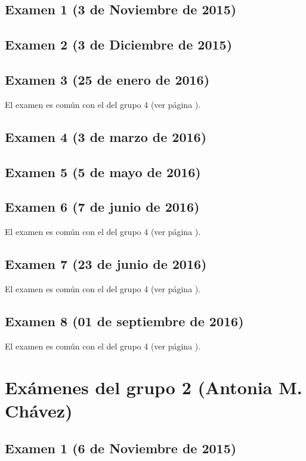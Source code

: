 \documentclass[a4paper,12pt,twoside]{book}
\begin{document}
\subsection{Examen 1 (3 de Noviembre de 2015)}
\subsection{Examen 2 (3 de Diciembre de 2015)}
\subsection{Examen 3 (25 de enero de 2016)}
El examen es común con el del grupo 4 (ver página \pageref{examen_15_16_4_3}).
\subsection{Examen 4 (3 de marzo de 2016)}
\subsection{Examen 5 (5 de mayo de 2016)}
\subsection{Examen 6 (7 de junio de 2016)} 
El examen es común con el del grupo 4 (ver página \pageref{examen_15_16_4_6}).
\subsection{Examen 7 (23 de junio de 2016)}
El examen es común con el del grupo 4 (ver página \pageref{examen_15_16_4_7}).
\subsection{Examen 8 (01 de septiembre de 2016)}
El examen es común con el del grupo 4 (ver página \pageref{examen_15_16_4_8}).

\section{Exámenes del grupo 2 (Antonia M. Chávez)}
\subsection{Examen 1 (6 de Noviembre de 2015)}
\end{document}
